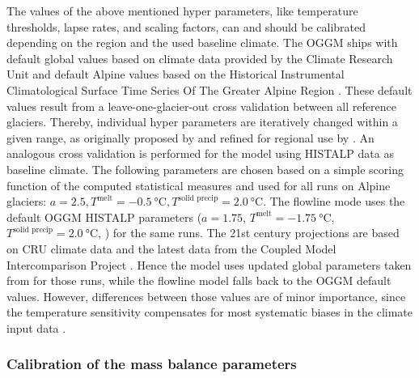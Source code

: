 
        The values of the above mentioned hyper parameters, like temperature thresholds, lapse rates, and scaling factors, can and should be calibrated depending on the region and the used baseline climate. The OGGM ships with default global values based on climate data provided by the Climate Research Unit \citep[CRU,][]{Harris2020} and default Alpine values based on the Historical Instrumental Climatological Surface Time Series Of The Greater Alpine Region \citep[HISTALP, ][]{Auer2007}. These default values result from a leave-one-glacier-out cross validation between all reference glaciers. Thereby, individual hyper parameters are iteratively changed within a given range, as originally proposed by \citet{Marzeion2012b} and refined for regional use by \citet{Dusch2018}. An analogous cross validation is performed for the \vas{} model using HISTALP data as baseline climate. The following parameters are chosen based on a simple scoring function of the computed statistical measures and used for all runs on Alpine glaciers: $a = 2.5, T^\text{melt} = \SI{-0.5}{\celsius}, T^\text{solid precip} = \SI{2.0}{\celsius}$. The flowline mode uses the default OGGM HISTALP parameters ($a = 1.75$, $T^\text{melt} = \SI{-1.75}{\celsius}$, $T^\text{solid precip} = \SI{2.0}{\celsius}$, \citet{Dusch2018}) for the same runs. The 21st century projections are based on CRU climate data and the latest data from the Coupled Model Intercomparison Project \citep[CMIP6, ][]{Eyring2016_CMIP}. Hence the \vas{} model uses updated global parameters taken from \citet{Malles2020} for those runs, while the flowline model falls back to the OGGM default values. However, differences between those values are of minor importance, since the temperature sensitivity \mustar{} compensates for most systematic biases in the climate input data \citep[Appendix A]{Maussion2019}.

        \subsubsection{Calibration of the mass balance parameters} %
        \label{ssub:mb_calib}


